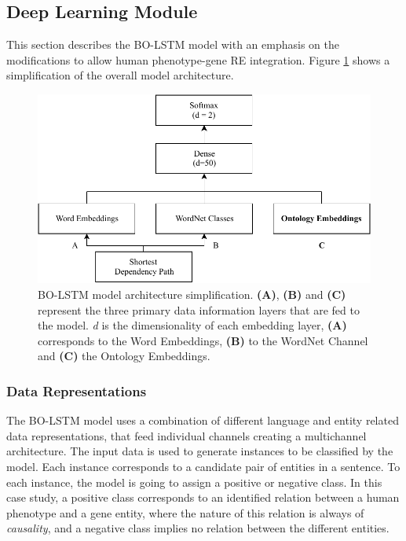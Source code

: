 
\hypertarget{4.1.2}{\subsection{Deep Learning Module}}

This section describes the BO-LSTM model with an emphasis on the modifications to allow human phenotype-gene RE integration. Figure \ref{figure:bo_lstm_architecture} shows a simplification of the overall model architecture. 

\begin{figure}[ht]
\captionsetup{font=small}
\centering
\includegraphics[width=14cm]{images/bo_lstm_architecture.pdf}
\fontsize{9}{10.8}\caption[BO-LSTM Model Architecture Simplification]{BO-LSTM model architecture simplification. \textbf{(A)}, \textbf{(B)} and \textbf{(C)} represent the three primary data information layers that are fed to the model. \textit{d} is the dimensionality of each embedding layer, \textbf{(A)} corresponds to the Word Embeddings, \textbf{(B)} to the WordNet Channel and \textbf{(C)} the Ontology Embeddings.}
\label{figure:bo_lstm_architecture}
\end{figure}



\hypertarget{4.1.2.1}{\subsubsection{Data Representations}}

The BO-LSTM model uses a combination of different language and entity related data representations, that feed individual channels creating a multichannel architecture. The input data is used to generate instances to be classified by the model. Each instance corresponds to a candidate pair of entities in a sentence. To each instance, the model is going to assign a positive or negative class. In this case study, a positive class corresponds to an identified relation between a human phenotype and a gene entity, where the nature of this relation is always of \textit{causality}, and a negative class implies no relation between the different entities.

